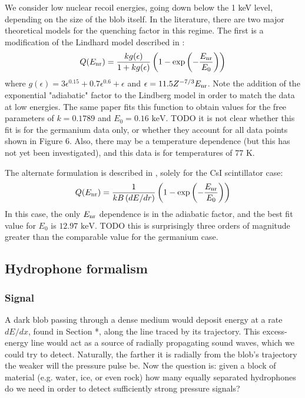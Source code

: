 \documentclass[%
 reprint,
 amsmath,amssymb,
 aps,nofootinbib
]{revtex4-1}
\begin{document}
We consider low nuclear recoil energies, going down below the 1 keV level, depending on the size of the blob itself. In the literature, there are two major theoretical models for the quenching factor in this regime. The first is a modification of the Lindhard model described in \citep{Scholz:2016}: $$Q(E_{\rm nr}) = \frac{k g(\epsilon)}{1+k g(\epsilon)}\left(1-\exp\left(-\frac{E_{\rm nr}}{E_0}\right) \right)$$ where $g(\epsilon)=3\epsilon^{0.15}+0.7\epsilon^{0.6}+\epsilon$ and $\epsilon=11.5Z^{-7/3}E_{\rm nr}$. Note the addition of the exponential "adiabatic" factor to the Lindberg model in order to match the data at low energies. The same paper fits this function to obtain values for the free parameters of $k=0.1789$ and $E_0=0.16 \text{ keV}$. TODO it is not clear whether this fit is for the germanium data only, or whether they account for all data points shown in Figure 6. Also, there may be a temperature dependence (but this has not yet been investigated), and this data is for temperatures of 77 K.

The alternate formulation is described in \citep{Collar:2019}, solely for the CsI scintillator case: $$Q(E_{\rm nr}) = \frac{1}{kB\, (dE/dr)}\left(1-\exp\left(-\frac{E_{\rm nr}}{E_0}\right) \right)$$ In this case, the only $E_{\rm nr}$ dependence is in the adiabatic factor, and the best fit value for $E_0$ is $12.97\text{ keV}$. TODO this is surprisingly three orders of magnitude greater than the comparable value for the germanium case.





\subsection{Hydrophone formalism}

\subsubsection{Signal}

A dark blob passing through a dense medium would deposit energy at a rate $dE/dx$, found in Section *, along the line traced by its trajectory. This excess-energy line would act as a source of radially propagating sound waves, which we could try to detect. Naturally, the farther it is radially from the blob's trajectory the weaker will the pressure pulse be. Now the question is: given a block of material (e.g. water, ice, or even rock) how many equally separated hydrophones do we need in order to detect sufficiently strong pressure signals?
\end{document}
